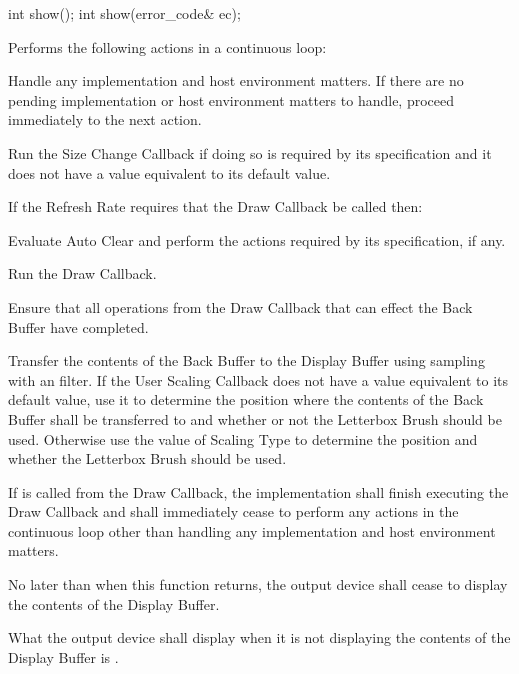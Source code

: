 \begin{itemdecl}
int show();
int show(error_code& ec);
\end{itemdecl}
\begin{itemdescr}
\pnum
\effects
Performs the following actions in a continuous loop:
\begin{enumeraten}
	\item Handle any implementation and host environment matters. If there are no pending implementation or host environment matters to handle, proceed immediately to the next action.
	\item Run the Size Change Callback if doing so is required by its specification and it does not have a value equivalent to its default value.
	\item If the Refresh Rate requires that the Draw Callback be called then:
	\begin{enumeratea}
		\item Evaluate Auto Clear and perform the actions required by its specification, if any.
		\item Run the Draw Callback.
		\item Ensure that all operations from the Draw Callback that can effect the Back Buffer have completed.
		\item Transfer the contents of the Back Buffer to the Display Buffer using sampling with an \unspecnorm filter. If the User Scaling Callback does not have a value equivalent to its default value, use it to determine the position where the contents of the Back Buffer shall be transferred to and whether or not the Letterbox Brush should be used. Otherwise use the value of Scaling Type to determine the position and whether the Letterbox Brush should be used.
	\end{enumeratea}
\end{enumeraten}

\pnum
If  is called from the Draw Callback, the implementation shall finish executing the Draw Callback and shall immediately cease to perform any actions in the continuous loop other than handling any implementation and host environment matters.

\pnum
No later than when this function returns, the output device shall cease to display the contents of the Display Buffer.

\pnum
What the output device shall display when it is not displaying the contents of the Display Buffer is \unspecnorm.


\end{itemdescr}
